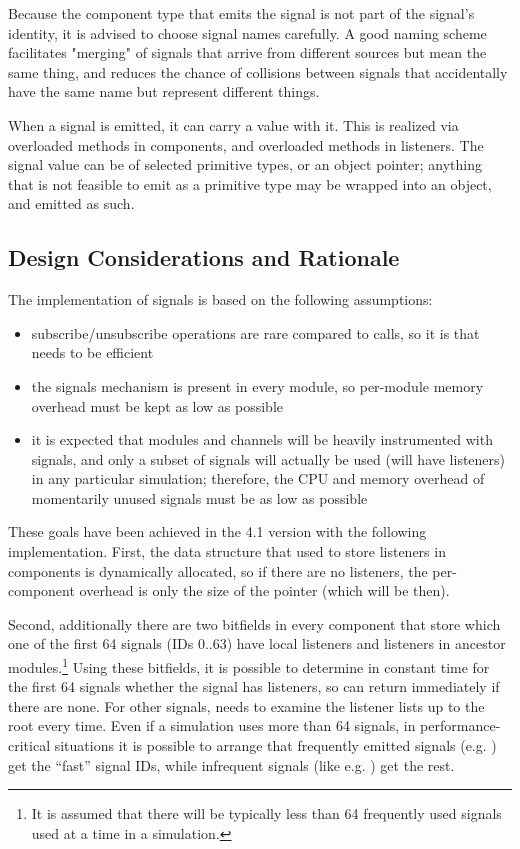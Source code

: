 \begin{note}
  Because the component type that emits the signal is not part of the signal's
  identity, it is advised to choose signal names carefully. A good naming scheme
  facilitates "merging" of signals that arrive from different sources but
  mean the same thing, and reduces the chance of collisions between signals that
  accidentally have the same name but represent different things.
\end{note}

When a signal is emitted, it can carry a value with it. This is realized via
overloaded  methods in components, and overloaded 
methods in listeners. The signal value can be of selected primitive types, or an
object pointer; anything that is not feasible to emit as a primitive type may be
wrapped into an object, and emitted as such.

\subsection{Design Considerations and Rationale}

The implementation of signals is based on the following assumptions:

\begin{itemize}
  \item subscribe/unsubscribe operations are rare compared to 
    calls, so it is  that needs to be efficient
  \item the signals mechanism is present in every module, so per-module
    memory overhead must be kept as low as possible
  \item it is expected that modules and channels will be heavily instrumented
    with signals, and only a subset of signals will actually be used
    (will have listeners) in any particular simulation; therefore,
    the CPU and memory overhead of momentarily unused signals must be
    as low as possible
\end{itemize}

These goals have been achieved in the 4.1 version with the following
implementation. First, the data structure that used to store listeners in
components is dynamically allocated, so if there are no listeners, the
per-component overhead is only the size of the pointer (which will be
 then).

Second, additionally there are two bitfields in every component that store
which one of the first 64 signals (IDs 0..63) have local listeners and
listeners in ancestor modules.\footnote{It is assumed that there will be
typically less than 64 frequently used signals used at a time in a
simulation.} Using these bitfields, it is possible to determine in constant
time for the first 64 signals whether the signal has listeners, so
 can return immediately if there are none. For other signals,
 needs to examine the listener lists up to the root every
time. Even if a simulation uses more than 64 signals, in
performance-critical situations it is possible to arrange that frequently
emitted signals (e.g. ) get the ``fast'' signal IDs, while
infrequent signals (like e.g. ) get the rest.

